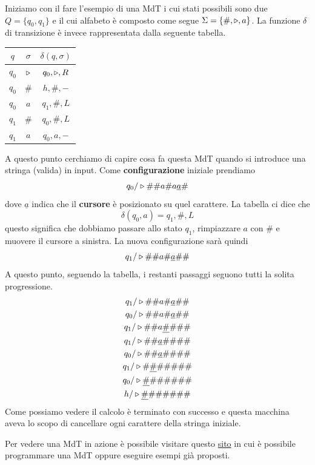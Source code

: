 \begin{example}
	Iniziamo con il fare l'esempio di una MdT i cui stati
	possibili sono due $Q = \{ q_0, q_1 \}$ e il cui alfabeto
	è composto come segue $\Sigma = \{ \#, \triangleright, a \}$.
	La funzione $\delta$ di transizione è invece rappresentata
	dalla seguente tabella.
	\begin{center}
		\begin{tabular}{| c | c | c |}
			\hline
			$q$   & $\sigma$ & $\delta(q, \sigma)$ \\
			\hline
			$q_0$ & $\triangleright$ & $q_0, \triangleright, R$    \\
			$q_0$ & $\#$     & $h, \#, -$          \\
			$q_0$ & $a$      & $q_1, \#, L$        \\
			$q_1$ & $\#$     & $q_0, \#, L$        \\
			$q_1$ & $a$      & $q_0, a, -$         \\
			\hline
		\end{tabular}
	\end{center}
	A questo punto cerchiamo di capire cosa fa questa MdT
	quando si introduce una stringa (valida) in input.
	Come \textbf{configurazione} iniziale prendiamo
	\[ q_0/ \triangleright \# \# a \# a \underline{a} \# \]
	dove $\underline{a}$ indica che il \textbf{cursore} è
	posizionato su quel carattere. La tabella ci dice che
	\[ \delta (q_0, a) = q_1, \#, L \]
	questo significa che dobbiamo passare allo stato $q_1$,
	rimpiazzare $a$ con $\#$ e muovere il cursore a sinistra.
	La nuova configurazione sarà quindi
	\[ q_1/ \triangleright \# \# a \# \underline{a} \# \# \]
	A questo punto, seguendo la tabella, i restanti passaggi
	seguono tutti la solita progressione.
	\begin{gather*}
		q_1/ \triangleright \# \# a \# \underline{a} \# \# \\
		q_0/ \triangleright \# \# a \# \underline{a} \# \# \\
		q_1/ \triangleright \# \# a \underline{\#} \# \# \# \\
		q_1/ \triangleright \# \# \underline{a} \# \# \# \# \\
		q_0/ \triangleright \# \# \underline{a} \# \# \# \# \\
		q_1/ \triangleright \# \underline{\#} \# \# \# \# \# \\
		q_0/ \triangleright \underline{\#} \# \# \# \# \# \# \\
		h/ \triangleright \underline{\#} \# \# \# \# \# \#
	\end{gather*}
	Come possiamo vedere il calcolo è terminato con successo
	e questa macchina aveva lo scopo di cancellare ogni
	carattere della stringa iniziale.
\end{example}
Per vedere una MdT in azione è possibile visitare questo
\href{https://turingmachinesimulator.com/}{sito} in cui è
possibile programmare una MdT oppure eseguire esempi già
proposti.

